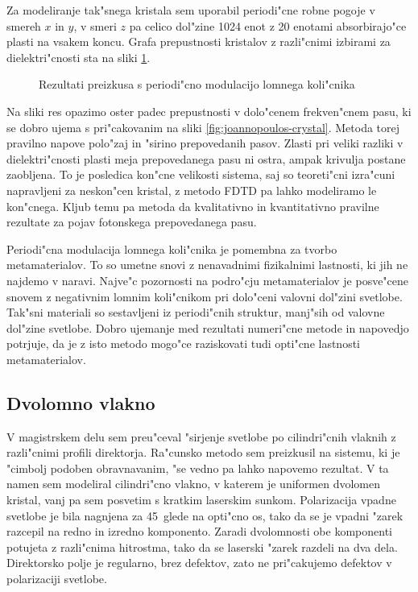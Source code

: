 \documentclass[a4paper,10pt]{article}
\begin{document}
Za modeliranje tak"snega kristala sem uporabil periodi"cne robne pogoje v smereh $x$ in $y$, v smeri $z$ pa celico dol"zine 1024 enot z 20 enotami absorbirajo"ce plasti na vsakem koncu. 
Grafa prepustnosti kristalov z razli"cnimi izbirami za dielektri"cnosti sta na sliki \ref{fig:test-periodic}. 

\begin{figure}[!htbp]
 
 \caption{Rezultati preizkusa s periodi"cno modulacijo lomnega koli"cnika}
 \label{fig:test-periodic}
\end{figure}

Na sliki res opazimo oster padec prepustnosti v dolo"cenem frekven"cnem pasu, ki se dobro ujema s pri"cakovanim na sliki \ref{fig:joannopoulos-crystal}. 
Metoda torej pravilno napove polo"zaj in "sirino prepovedanih pasov. 
Zlasti pri veliki razliki v dielektri"cnosti plasti meja prepovedanega pasu ni ostra, ampak krivulja postane zaobljena. 
To je posledica kon"cne velikosti sistema, saj so teoreti"cni izra"cuni napravljeni za neskon"cen kristal, z metodo \acs{FDTD} pa lahko modeliramo le kon"cnega. 
Kljub temu pa metoda da kvalitativno in kvantitativno pravilne rezultate za pojav fotonskega prepovedanega pasu. 

Periodi"cna modulacija lomnega koli"cnika je pomembna za tvorbo metamaterialov\cite{metamaterials}. 
To so umetne snovi z nenavadnimi fizikalnimi lastnosti, ki jih ne najdemo v naravi. 
Najve"c pozornosti na podro"cju metamaterialov je posve"cene snovem z negativnim lomnim koli"cnikom pri dolo"ceni valovni dol"zini svetlobe. 
Tak"sni materiali so sestavljeni iz periodi"cnih struktur, manj"sih od valovne dol"zine svetlobe. 
Dobro ujemanje med rezultati numeri"cne metode in napovedjo potrjuje, da je z isto metodo mogo"ce raziskovati tudi opti"cne lastnosti metamaterialov. 

\subsection{Dvolomno vlakno}
V magistrskem delu sem preu"ceval "sirjenje svetlobe po cilindri"cnih vlaknih z razli"cnimi profili direktorja. 
Ra"cunsko metodo sem preizkusil na sistemu, ki je "cimbolj podoben obravnavanim, "se vedno pa lahko napovemo rezultat. 
V ta namen sem modeliral cilindri"cno vlakno, v katerem je uniformen dvolomen kristal, vanj pa sem posvetim s kratkim laserskim sunkom. 
Polarizacija vpadne svetlobe je bila nagnjena za 45\degree~glede na opti"cno os, tako da se je vpadni "zarek razcepil na redno in izredno komponento. 
Zaradi dvolomnosti obe komponenti potujeta z razli"cnima hitrostma, tako da se laserski "zarek razdeli na dva dela. 
Direktorsko polje je regularno, brez defektov, zato ne pri"cakujemo defektov v polarizaciji svetlobe. 
\end{document}
